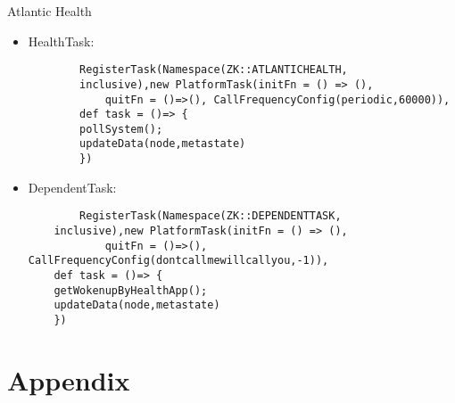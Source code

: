\documentclass{beamer}
\begin{document}
\begin{frame}[fragile]{Atlantic Health}
	\tiny
	\begin{itemize}
		\item HealthTask:
		\begin{lstlisting}
		RegisterTask(Namespace(ZK::ATLANTICHEALTH,
		inclusive),new PlatformTask(initFn = () => (),
			quitFn = ()=>(), CallFrequencyConfig(periodic,60000)), 
		def task = ()=> {
		pollSystem();
		updateData(node,metastate)	
		})
		\end{lstlisting}

		\item DependentTask:
		\begin{lstlisting}
		RegisterTask(Namespace(ZK::DEPENDENTTASK,
	inclusive),new PlatformTask(initFn = () => (),
			quitFn = ()=>(), CallFrequencyConfig(dontcallmewillcallyou,-1)), 
	def task = ()=> {
	getWokenupByHealthApp();	
	updateData(node,metastate)	
	})
	\end{lstlisting}


	\end{itemize}
\end{frame}



\appendix

\section*{Appendix}
\end{document}
